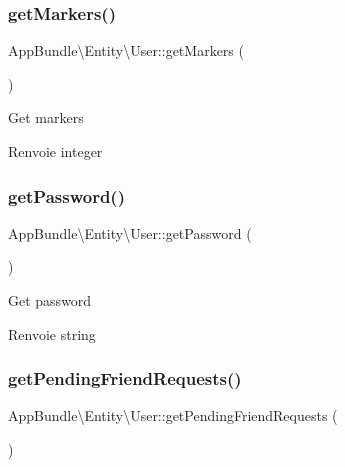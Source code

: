\subsubsection{\texorpdfstring{get\+Markers()}{getMarkers()}}
{\footnotesize\ttfamily App\+Bundle\textbackslash{}\+Entity\textbackslash{}\+User\+::get\+Markers (\begin{DoxyParamCaption}{ }\end{DoxyParamCaption})}

Get markers

\begin{DoxyReturn}{Renvoie}
integer 
\end{DoxyReturn}
\mbox{\label{classAppBundle_1_1Entity_1_1User_ad3e3f65ed144a768cad99df4d588cd63}} 
\subsubsection{\texorpdfstring{get\+Password()}{getPassword()}}
{\footnotesize\ttfamily App\+Bundle\textbackslash{}\+Entity\textbackslash{}\+User\+::get\+Password (\begin{DoxyParamCaption}{ }\end{DoxyParamCaption})}

Get password

\begin{DoxyReturn}{Renvoie}
string 
\end{DoxyReturn}
\mbox{\label{classAppBundle_1_1Entity_1_1User_a8adb6142b8443d5cb2b63c55327f067b}} 
\subsubsection{\texorpdfstring{get\+Pending\+Friend\+Requests()}{getPendingFriendRequests()}}
{\footnotesize\ttfamily App\+Bundle\textbackslash{}\+Entity\textbackslash{}\+User\+::get\+Pending\+Friend\+Requests (\begin{DoxyParamCaption}{ }\end{DoxyParamCaption})}

